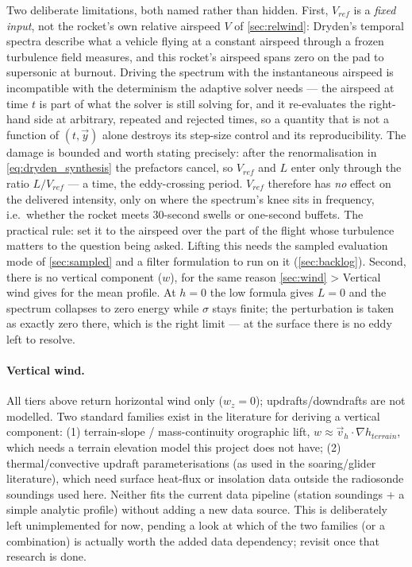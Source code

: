 Two deliberate limitations, both named rather than hidden. First, $V_{ref}$ is a \emph{fixed input},
not the rocket's own relative airspeed $V$ of \autoref{sec:relwind}: Dryden's temporal spectra
describe what a vehicle flying at a constant airspeed through a frozen turbulence field measures,
and this rocket's airspeed spans zero on the pad to supersonic at burnout. Driving the spectrum
with the instantaneous airspeed is incompatible with the determinism the adaptive solver needs ---
the airspeed at time $t$ is part of what the solver is still solving for, and it re-evaluates the
right-hand side at arbitrary, repeated and rejected times, so a quantity that is not a function of
$(t,\vec{y})$ alone destroys its step-size control and its reproducibility. The damage is bounded
and worth stating precisely: after the renormalisation in \autoref{eq:dryden_synthesis} the
prefactors cancel, so $V_{ref}$ and $L$ enter only through the ratio $L/V_{ref}$ --- a time, the
eddy-crossing period. $V_{ref}$ therefore has \emph{no} effect on the delivered intensity, only on
where the spectrum's knee sits in frequency, i.e.\ whether the rocket meets 30-second swells or
one-second buffets. The practical rule: set it to the airspeed over the part of the flight whose
turbulence matters to the question being asked. Lifting this needs the sampled evaluation mode of
\autoref{sec:sampled} and a filter formulation to run on it (\autoref{sec:backlog}). Second, there
is no vertical component ($w$), for the same reason \autoref{sec:wind} > Vertical wind gives for
the mean profile. At $h=0$ the low formula gives $L=0$ and the spectrum collapses to zero energy
while $\sigma$ stays finite; the perturbation is taken as exactly zero there, which is the right
limit --- at the surface there is no eddy left to resolve.

\paragraph{Vertical wind.} All tiers above return horizontal wind only ($w_z=0$);
updrafts/downdrafts are not modelled. Two standard families exist in the literature for deriving a
vertical component: (1) terrain-slope / mass-continuity orographic lift, $w\approx\vec{v}_h\cdot
\nabla h_{terrain}$, which needs a terrain elevation model this project does not have; (2)
thermal/convective updraft parameterisations (as used in the soaring/glider literature), which need
surface heat-flux or insolation data outside the radiosonde soundings used here. Neither fits the
current data pipeline (station soundings + a simple analytic profile) without adding a new data
source. This is deliberately left unimplemented for now, pending a look at which of the two
families (or a combination) is actually worth the added data dependency; revisit once that
research is done.

